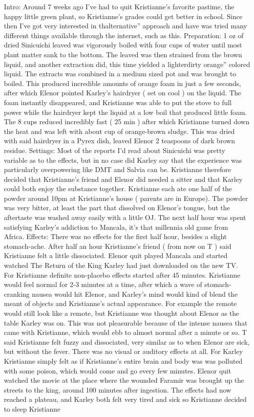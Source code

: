\documentclass[12pt]{book}
\begin{document}
Intro: Around 7 weeks ago I've had to quit Kristianne's favorite pastime, the happy little green plant, so Kristianne's grades could get better in school. Since then I've got very interested in thalternative'' approach and have was tried many different things available through the internet, such as this. Preparation: 1 oz of dried Sinicuichi leaved was vigorously boiled with four cups of water until most plant matter sank to the bottom. The leaved was then strained from the brown liquid, and another extraction did, this time yielded a lighterdirty orange'' colored liquid. The extracts was combined in a medium sized pot and was brought to boiled. This produced incredible amounts of orange foam in just a few seconds, after which Elenor pointed Karley's hairdryer ( set on cool ) on the liquid. The foam instantly disappeared, and Kristianne was able to put the stove to full power while the hairdryer kept the liquid at a low boil that produced little foam. The 8 cups reduced incredibly fast ( 25 min ) after which Kristianne turned down the heat and was left with about  cup of orange-brown sludge. This was dried with said hairdryer in a Pyrex dish, leaved Elenor 2 teaspoons of dark brown residue. Settings: Most of the reports I'd read about Sinicuichi was pretty variable as to the effects, but in no case did Karley say that the experience was particularly overpowering like DMT and Salvia can be. Kristianne therefore decided that Kristianne's friend and Elenor did needed a sitter and that Karley could both enjoy the substance together. Kristianne each ate one half of the powder around 10pm at Kristianne's house ( parents are in Europe). The powder was very bitter, at least the part that dissolved on Elenor's tongue, but the aftertaste was washed away easily with a little OJ. The next half hour was spent satisfying Karley's addiction to Mancala, it's that millennia old game from Africa. Effects: There was no effects for the first half hour, besides a slight stomach-ache. After half an hour Kristianne's friend ( from now on T ) said Kristianne felt a little dissociated. Elenor quit played Mancala and started watched The Return of the King Karley had just downloaded on the new TV. For Kristianne definite non-placebo effects started after 45 minutes. Kristianne would feel normal for 2-3 minutes at a time, after which a wave of stomach-cranking nausea would hit Elenor, and Karley's mind would kind of blend the meant of objects and Kristianne's actual appearance. For example the remote would still look like a remote, but Kristianne was thought about Elenor as the table Karley was on. This was not pleasurable because of the intense nausea that came with Kristianne, which would ebb to almost normal after a minute or so. T said Kristianne felt fuzzy and dissociated, very similar as to when Elenor are sick, but without the fever. There was no visual or auditory effects at all. For Karley Kristianne simply felt as if Kristianne's entire brain and body was was polluted with some poison, which would come and go every few minutes. Elenor quit watched the movie at the place where the wounded Faramir was brought up the streets to the king, around 100 minutes after ingestion. The effects had now reached a plateau, and Karley both felt very tired and sick so Kristianne decided to sleep Kristianne 
\end{document}
